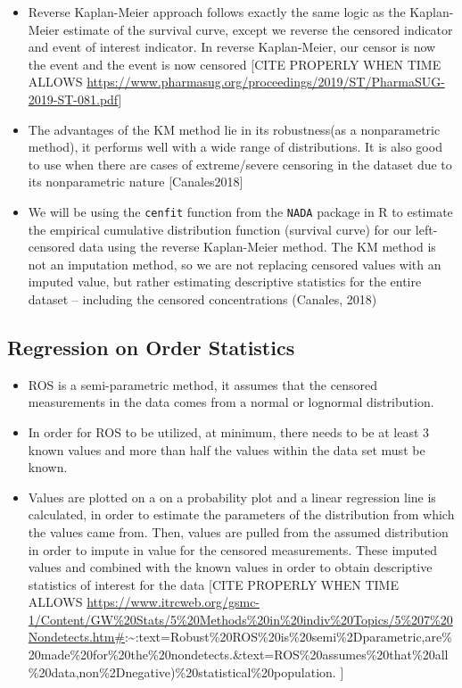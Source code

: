 \documentclass[12pt, twoside]{amherstthesis}
\begin{document}
\begin{itemize}
\item
  Reverse Kaplan-Meier approach follows exactly the same logic as the Kaplan-Meier estimate of the survival curve, except we reverse the censored indicator and event of interest indicator. In reverse Kaplan-Meier, our censor is now the event and the event is now censored {[}CITE PROPERLY WHEN TIME ALLOWS \url{https://www.pharmasug.org/proceedings/2019/ST/PharmaSUG-2019-ST-081.pdf}{]}
\item
  The advantages of the KM method lie in its robustness(as a nonparametric method), it performs well with a wide range of distributions. It is also good to use when there are cases of extreme/severe censoring in the dataset due to its nonparametric nature {[}Canales2018{]}
\item
  We will be using the \texttt{cenfit} function from the \texttt{NADA} package in R to estimate the empirical cumulative distribution function (survival curve) for our left-censored data using the reverse Kaplan-Meier method. The KM method is not an imputation method, so we are not replacing censored values with an imputed value, but rather estimating descriptive statistics for the entire dataset -- including the censored concentrations (Canales, 2018)
\end{itemize}
\hypertarget{ROS}{%
\subsection{Regression on Order Statistics}\label{ROS}}
\begin{itemize}
\item
  ROS is a semi-parametric method, it assumes that the censored measurements in the data comes from a normal or lognormal distribution.
\item
  In order for ROS to be utilized, at minimum, there needs to be at least 3 known values and more than half the values within the data set must be known.
\item
  Values are plotted on a on a probability plot and a linear regression line is calculated, in order to estimate the parameters of the distribution from which the values came from. Then, values are pulled from the assumed distribution in order to impute in value for the censored measurements. These imputed values and combined with the known values in order to obtain descriptive statistics of interest for the data {[}CITE PROPERLY WHEN TIME ALLOWS \url{https://www.itrcweb.org/gsmc-1/Content/GW\%20Stats/5\%20Methods\%20in\%20indiv\%20Topics/5\%207\%20Nondetects.htm\#}:\textasciitilde:text=Robust\%20ROS\%20is\%20semi\%2Dparametric,are\%20made\%20for\%20the\%20nondetects.\&text=ROS\%20assumes\%20that\%20all\%20data,non\%2Dnegative)\%20statistical\%20population. {]}
\end{itemize}
\end{document}
